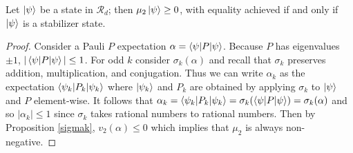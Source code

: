 \documentclass[12pt]{dalthesis}
\begin{document}
\begin{proposition}
Let $\ket{\psi}$ be a state in $\mathcal{R}_d$; then $\mu_2\ket{\psi} \geq 0$, with equality achieved if and only if $\ket{\psi}$ is a stabilizer state. 
\end{proposition}
\begin{proof}
Consider a Pauli $P$ expectation $\alpha = \braket{\psi |P| \psi}$. Because $P$ has eigenvalues $\pm 1$, $|\braket{\psi |P| \psi}| \leq 1$. For odd $k$ consider $\sigma_k(\alpha)$ and recall that $\sigma_k$ preserves addition, multiplication, and conjugation. Thus we can write $\alpha_k$ as the expectation $\braket{\psi_k |P_k| \psi_k}$ where $\ket{\psi_k}$ and $P_k$ are obtained by applying $\sigma_k$ to $\ket{\psi}$ and $P$ element-wise. It follows that $\alpha_k = \braket{\psi_k |P_k| \psi_k} = \sigma_k (\braket{\psi |P| \psi}) = \sigma_k (\alpha)$ and so $|\alpha_k| \leq 1$ since $\sigma_k$ takes rational numbers to rational numbers. Then by Proposition \ref{sigmak}, $v_2(\alpha) \leq 0$ which implies that $\mu_2$ is always non-negative. 


\end{proof}
\end{document}

